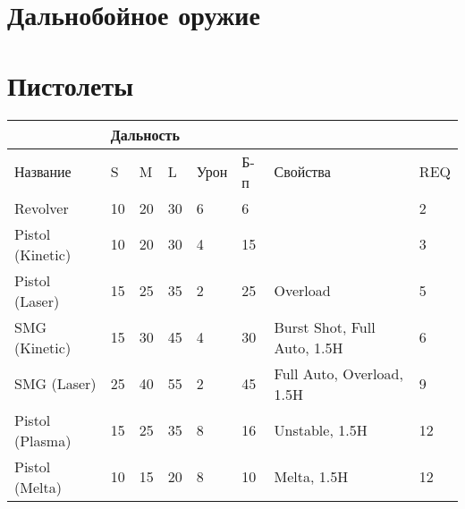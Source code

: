 \section*{Дальнобойное оружие}

    \section*{Пистолеты}
        \begin{table}[H]
            \centering
            \begin{tabular}{|l|lll|l|l|l|l|}
                \hline
                                & \multicolumn{3}{l|}{Дальность}                         &      &     &                             &     \\ \hline
                Название         & \multicolumn{1}{l|}{S}  & \multicolumn{1}{l|}{M}  & L  & Урон & Б-п & Свойства                    & REQ \\ \hline
                Revolver         & \multicolumn{1}{l|}{10} & \multicolumn{1}{l|}{20} & 30 & 6    & 6   &                             & 2   \\ \hline
                Pistol (Kinetic) & \multicolumn{1}{l|}{10} & \multicolumn{1}{l|}{20} & 30 & 4    & 15  &                             & 3   \\ \hline
                Pistol (Laser)   & \multicolumn{1}{l|}{15} & \multicolumn{1}{l|}{25} & 35 & 2    & 25  & Overload                    & 5   \\ \hline
                SMG (Kinetic)    & \multicolumn{1}{l|}{15} & \multicolumn{1}{l|}{30} & 45 & 4    & 30  & Burst Shot, Full Auto, 1.5H & 6   \\ \hline
                SMG (Laser)      & \multicolumn{1}{l|}{25} & \multicolumn{1}{l|}{40} & 55 & 2    & 45  & Full Auto, Overload, 1.5H   & 9   \\ \hline
                Pistol (Plasma)  & \multicolumn{1}{l|}{15} & \multicolumn{1}{l|}{25} & 35 & 8    & 16  & Unstable, 1.5H              & 12  \\ \hline
                Pistol (Melta)   & \multicolumn{1}{l|}{10} & \multicolumn{1}{l|}{15} & 20 & 8    & 10  & Melta, 1.5H                 & 12  \\ \hline
            \end{tabular}
        \end{table}

